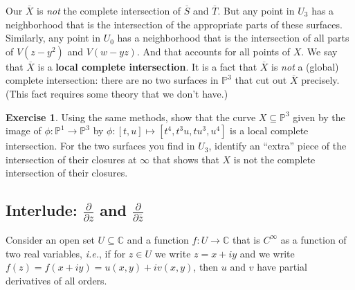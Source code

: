 \documentclass[12pt]{article}
\newcommand{\cx}{\mathbb{C}}
\newcommand{\p}{\mathbb{P}}
\newcommand{\ita}[1]{\textit{#1}}
\theoremstyle{definition}
\newtheorem{exercise}{Exercise}
\theoremstyle{remark}
\begin{document}
Our $\overline{X}$ is \ita{not} the complete intersection of $\overline{S}$ and $\overline{T}$. But any point in $U_3$ has a neighborhood that is the intersection of the appropriate parts of these surfaces. Similarly, any point in $U_0$ has a neighborhood that is the intersection of all parts of $V(z - y^2)$ and $V(w - yz)$. And that accounts for all points of $X$. We say that $\overline{X}$ is a \textbf{local complete intersection}. It is a fact that $\overline{X}$ is \ita{not} a (global) complete intersection: there are no two surfaces in $\p^3$ that cut out $\overline{X}$ precisely. (This fact requires some theory that we don't have.)
\begin{exercise}
    Using the same methods, show that the curve $X \subseteq \p^3$ given by the image of $\phi : \p^1 \to \p^3$ by $\phi : [t,u] \mapsto [t^4 , t^3u , tu^3 , u^4]$ is a local complete intersection. For the two surfaces you find in $U_3$, identify an ``extra'' piece of the intersection of their closures at $\infty$ that shows that $X$ is not the complete intersection of their closures.
\end{exercise}
\subsection{Interlude: \texorpdfstring{$\frac{\partial}{\partial z}$}{d/dz} and \texorpdfstring{$\frac{\partial}{\partial \overline{z}}$}{d/dz}}
Consider an open set $U \subseteq \cx$ and a function $f : U \to \cx$ that is $C^{\infty}$ as a function of two real variables, \ita{i.e.}, if for $z \in U$ we write $z = x + i y$ and we write $f(z) = f(x + i y) = u(x,y) + i v(x,y)$, then $u$ and $v$ have partial derivatives of all orders.
\end{document}
